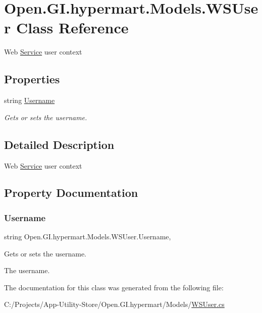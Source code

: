 \hypertarget{class_open_1_1_g_i_1_1hypermart_1_1_models_1_1_w_s_user}{}\section{Open.\+G\+I.\+hypermart.\+Models.\+W\+S\+User Class Reference}
\label{class_open_1_1_g_i_1_1hypermart_1_1_models_1_1_w_s_user}


Web \hyperlink{class_open_1_1_g_i_1_1hypermart_1_1_models_1_1_service}{Service} user context  


\subsection*{Properties}
\begin{DoxyCompactItemize}
\item 
string \hyperlink{class_open_1_1_g_i_1_1hypermart_1_1_models_1_1_w_s_user_abac0141052e93f2fc9e882298f0af914}{Username}
\begin{DoxyCompactList}\small\item\em Gets or sets the username. \end{DoxyCompactList}\end{DoxyCompactItemize}


\subsection{Detailed Description}
Web \hyperlink{class_open_1_1_g_i_1_1hypermart_1_1_models_1_1_service}{Service} user context 



\subsection{Property Documentation}
\hypertarget{class_open_1_1_g_i_1_1hypermart_1_1_models_1_1_w_s_user_abac0141052e93f2fc9e882298f0af914}{}\label{class_open_1_1_g_i_1_1hypermart_1_1_models_1_1_w_s_user_abac0141052e93f2fc9e882298f0af914} 
\subsubsection{\texorpdfstring{Username}{Username}}
{\footnotesize\ttfamily string Open.\+G\+I.\+hypermart.\+Models.\+W\+S\+User.\+Username\hspace{0.3cm}{\ttfamily [get]}, {\ttfamily [set]}}



Gets or sets the username. 

The username. 

The documentation for this class was generated from the following file\+:\begin{DoxyCompactItemize}
\item 
C\+:/\+Projects/\+App-\/\+Utility-\/\+Store/\+Open.\+G\+I.\+hypermart/\+Models/\hyperlink{_w_s_user_8cs}{W\+S\+User.\+cs}\end{DoxyCompactItemize}
